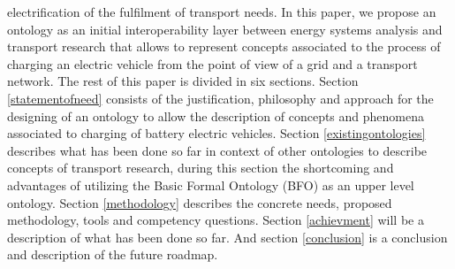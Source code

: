 electrification of the fulfilment of transport needs. In this paper, we propose
an ontology as an initial interoperability layer between energy systems
analysis and transport research that allows to represent concepts associated to
the process of charging an electric vehicle from the point of view of a grid
and a transport network. The rest of this paper is divided in six sections.
Section \ref{statementofneed} consists of the justification, philosophy and
approach for the designing of an ontology to allow the description of concepts
and phenomena associated to charging of battery electric vehicles. Section
\ref{existingontologies} describes what has been done so far in context of
other ontologies to describe concepts of transport research, during this
section the shortcoming and advantages of utilizing the Basic Formal Ontology
(BFO) \cite{Arp.2015} as an upper level ontology. Section \ref{methodology}
describes the concrete needs, proposed methodology, tools and competency
questions. Section \ref{achievment} will be a description of what has been done
so far. And section \ref{conclusion} is a conclusion and description of the
future roadmap.

